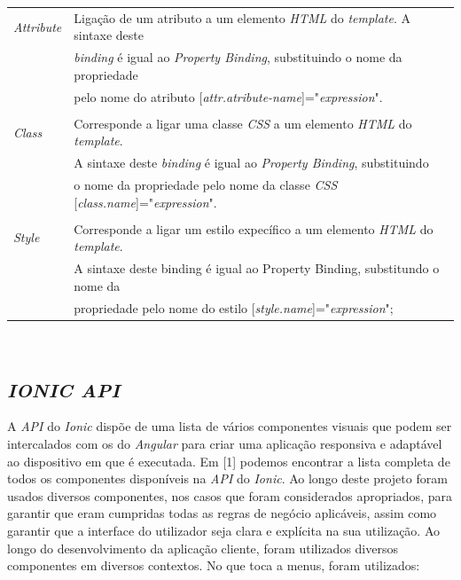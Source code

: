 \begin{tabular}{ll}
	\textit{Attribute} & Ligação de um atributo a um elemento \textit{HTML} do \textit{template}. A sintaxe deste\\
	& \textit{binding} é igual ao \textit{Property Binding}, substituindo o nome da propriedade\\
	& pelo nome do atributo [\textit{attr.atribute-name}]="\textit{expression}".\\
	\\
	\textit{Class} & Corresponde a ligar uma classe \textit{CSS} a um elemento \textit{HTML} do \textit{template}. \\
	&A sintaxe deste \textit{binding} é igual ao \textit{Property Binding}, substituindo \\
	&o nome da propriedade pelo nome da classe \textit{CSS} [\textit{class.name}]="\textit{expression}".\\
	\\
	\textit{Style} & Corresponde a ligar um estilo expecífico a um elemento \textit{HTML} do \textit{template}. \\
	&A sintaxe deste binding é igual ao Property Binding, substitundo o nome da \\
	&propriedade pelo nome do estilo [\textit{style.name}]="\textit{expression}";\\
\end{tabular}
\\

\subsection{\textit{IONIC API}}\label{subsec414}

A \textit{API} do \textit{Ionic} dispõe de uma lista de vários componentes visuais que podem ser intercalados com os do \textit{Angular} para criar uma aplicação responsiva e adaptável ao dispositivo em que é executada. Em [1] podemos encontrar a lista completa de todos os componentes disponíveis na \textit{API} do \textit{Ionic}. Ao longo deste projeto foram usados diversos componentes, nos casos que foram considerados apropriados, para garantir que eram cumpridas todas as regras de negócio aplicáveis, assim como garantir que a interface do utilizador seja clara e explícita na sua utilização.
Ao longo do desenvolvimento da aplicação cliente, foram utilizados diversos componentes em diversos contextos. No que toca a menus, foram utilizados:\\


